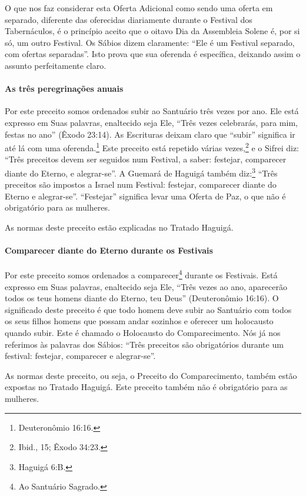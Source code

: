 O que nos faz considerar esta Oferta Adicional como sendo uma oferta em
separado, diferente das oferecidas diariamente durante o Festival dos
Tabernáculos, é o princípio aceito que o oitavo Dia da Assembleia Solene
é, por si só, um outro Festival. Os Sábios dizem claramente: ``Ele é um
Festival separado, com ofertas separadas''. Isto prova que sua oferenda
é específica, deixando assim o assunto perfeitamente claro.

\paragraph{As três peregrinações anuais}

Por este preceito somos ordenados subir ao Santuário três vezes por ano.
Ele está expresso em Suas palavras, enaltecido seja Ele, ``Três vezes
celebrarás, para mim, festas no ano'' (Êxodo 23:14). As Escrituras deixam
claro que ``subir'' significa ir até lá com uma oferenda.\footnote{Deuteronômio 16:16.}
Este preceito está repetido várias vezes,\footnote{Ibid., 15; Êxodo 34:23.} e o
Sifrei diz: ``Três preceitos devem ser seguidos num Festival, a saber: festejar, comparecer diante do Eterno, e alegrar-se''. A Guemará
de Haguigá também diz:\footnote{Haguigá 6:B.} ``Três preceitos são
impostos a Israel num Festival: festejar, comparecer diante do Eterno e alegrar-se''. ``Festejar'' significa levar uma Oferta de Paz, o que não é obrigatório para as
mulheres.

As normas deste preceito estão explicadas no Tratado Haguigá.


\paragraph{Comparecer diante do Eterno durante os Festivais}

Por este preceito somos ordenados a comparecer\footnote{Ao Santuário Sagrado.}
durante os Festivais. Está expresso em Suas palavras, enaltecido seja
Ele, ``Três vezes ao ano, aparecerão todos os teus homens diante do
Eterno, teu Deus'' (Deuteronômio 16:16). O significado deste preceito é
que todo homem deve subir ao Santuário com todos os seus filhos homens
que possam andar sozinhos e oferecer um holocausto quando subir. Este é
chamado o Holocausto do Comparecimento. Nós já nos referimos às palavras
dos Sábios: ``Três preceitos são obrigatórios durante um festival:
festejar, comparecer e alegrar-se''.

As normas deste preceito, ou seja, o Preceito do Comparecimento, também
estão expostas no Tratado Haguigá. Este preceito também não é
obrigatório para as mulheres.

